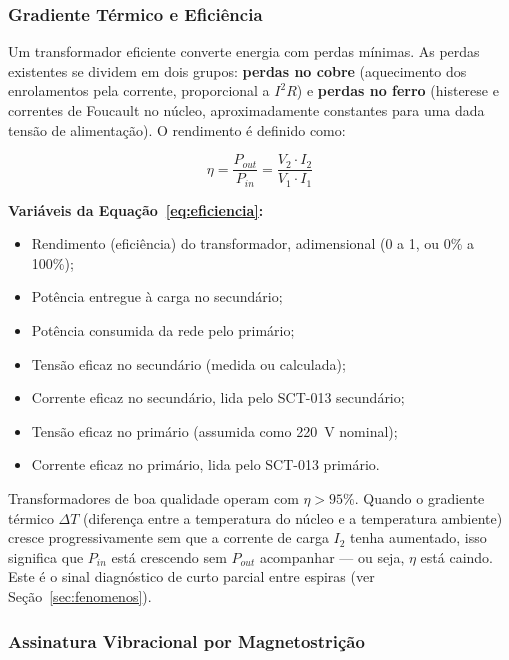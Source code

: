 \documentclass[12pt, a4paper]{article}
\begin{document}
\subsubsection{Gradiente Térmico e Eficiência}

Um transformador eficiente converte energia com perdas mínimas. As perdas existentes se dividem em dois grupos: \textbf{perdas no cobre} (aquecimento dos enrolamentos pela corrente, proporcional a $I^2 R$) e \textbf{perdas no ferro} (histerese e correntes de Foucault no núcleo, aproximadamente constantes para uma dada tensão de alimentação). O rendimento é definido como:

\begin{equation}
    \eta = \frac{P_{out}}{P_{in}} = \frac{V_2 \cdot I_2}{V_1 \cdot I_1}
    \label{eq:eficiencia}
\end{equation}

\noindent\textbf{Variáveis da Equação~\ref{eq:eficiencia}:}
\begin{itemize}[leftmargin=3cm, itemsep=2pt, topsep=4pt]
    \item[$\eta$]            Rendimento (eficiência) do transformador, adimensional (0 a 1, ou 0\% a 100\%);
    \item[$P_{out}$ (W)]     Potência entregue à carga no secundário;
    \item[$P_{in}$ (W)]      Potência consumida da rede pelo primário;
    \item[$V_2$ (V)]         Tensão eficaz no secundário (medida ou calculada);
    \item[$I_2$ (A)]         Corrente eficaz no secundário, lida pelo SCT-013 secundário;
    \item[$V_1$ (V)]         Tensão eficaz no primário (assumida como 220~V nominal);
    \item[$I_1$ (A)]         Corrente eficaz no primário, lida pelo SCT-013 primário.
\end{itemize}

\noindent Transformadores de boa qualidade operam com $\eta > 95\%$. Quando o gradiente térmico $\Delta T$ (diferença entre a temperatura do núcleo e a temperatura ambiente) cresce progressivamente sem que a corrente de carga $I_2$ tenha aumentado, isso significa que $P_{in}$ está crescendo sem $P_{out}$ acompanhar --- ou seja, $\eta$ está caindo. Este é o sinal diagnóstico de curto parcial entre espiras (ver Seção~\ref{sec:fenomenos}).

\subsubsection{Assinatura Vibracional por Magnetostrição}
\end{document}
